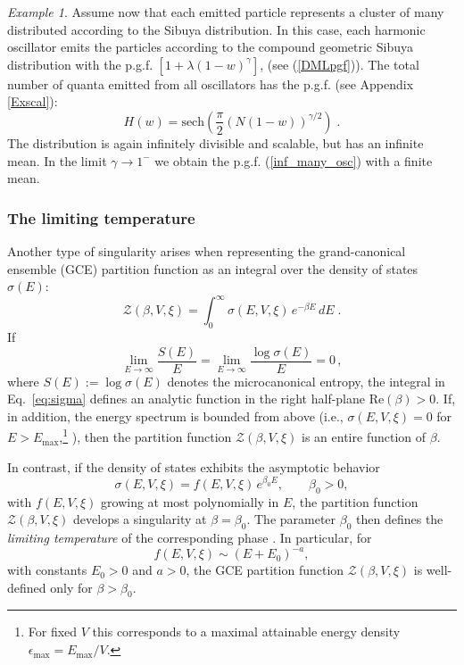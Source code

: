 \documentclass[a4paper,12pt]{amsart}
\theoremstyle{definition}
\theoremstyle{remark}
\newtheorem{Example}{Example}[section]
\begin{document}
\begin{Example}
Assume now that each emitted particle represents a cluster of many distributed according to the Sibuya distribution. In this case, each harmonic oscillator emits the particles according to the compound geometric Sibuya distribution with the p.g.f. $[1+\lambda(1-w)^{\gamma}]$, (see (\ref{DMLpgf})). The total number of quanta emitted from all oscillators has the p.g.f. (see  Appendix \ref{Exscal}):
\[
H(w) = \text{sech}\left(\frac{\pi}{2}(N(1-w))^{\gamma/2}\right)\;.
\]
The distribution is again infinitely divisible and scalable, but has an infinite mean. In the limit $\gamma\to1^{-}$ we obtain the p.g.f. (\ref{inf_many_osc}) with a finite mean.
 \end{Example}

\subsubsection{The limiting temperature}
Another type of singularity arises when representing the grand-canonical ensemble (GCE) partition function as an integral over the density of states $\sigma(E)$:
\begin{equation}\label{eq:sigma}
    \mathcal{Z}(\beta, V,\xi)= \int_0^{\infty}\sigma(E,V, \xi)\, e^{-\beta E}\, dE \;.
\end{equation}
If 
\[
\lim_{E \to \infty}\frac{S(E)}{E} = \lim_{E \to \infty}\frac{\log\sigma(E)}{E} = 0 \,,
\]
where $S(E) := \log \sigma(E)$ denotes the microcanonical entropy, the integral in Eq.~\eqref{eq:sigma} defines an analytic function in the right half-plane $\mathrm{Re}(\beta) > 0$. If, in addition, the energy spectrum is bounded from above (i.e., $\sigma(E, V, \xi) = 0$ for $E > E_{\max}$,\footnote{For fixed $V$ this corresponds to a maximal attainable energy density $\epsilon_{\max} = E_{\max}/V$.} ), then the partition function $\mathcal{Z}(\beta, V, \xi)$ is an entire function of $\beta$.

In contrast, if the density of states exhibits the asymptotic behavior
\[
\sigma(E, V, \xi) = f(E, V, \xi)\, e^{\beta_0 E}, \qquad \beta_0 > 0,
\]
with $f(E, V, \xi)$ growing at most polynomially in $E$, the partition function $\mathcal{Z}(\beta, V, \xi)$ develops a singularity at $\beta = \beta_0$. The parameter $\beta_0$ then defines the {\it limiting temperature} of the corresponding phase \cite{Hagedorn:1985js, Rumer:1960}. In particular, for 
\[
f(E, V,\xi)\sim (E+E_0)^{-a},
\]
with constants $E_0>0$ and $a>0$, the GCE partition function $\mathcal{Z}(\beta, V, \xi)$ is well-defined only for $\beta > \beta_0$. 
\end{document}
